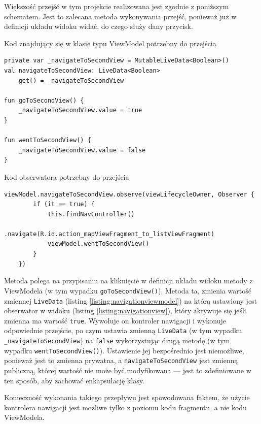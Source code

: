 \documentclass[polish,polish,a4paper,12pt]{article}
\begin{document}
	Większość przejść w tym projekcie realizowana jest zgodnie z poniższym schematem. Jest to zalecana metoda wykonywania przejść, ponieważ już w definicji układu widoku widać, do czego służy dany przycisk.

	\begin{listing}[H]
		\caption{Kod znajdujący się w klasie typu ViewModel potrzebny do przejścia}
		\begin{verbatim}
private var _navigateToSecondView = MutableLiveData<Boolean>()
val navigateToSecondView: LiveData<Boolean>
	get() = _navigateToSecondView

fun goToSecondView() {
	_navigateToSecondView.value = true
}

fun wentToSecondView() {
	_navigateToSecondView.value = false
}
		\end{verbatim}
		\label{listing:navigationviewmodel}
	\end{listing}

	\begin{listing}[H]
		\caption{Kod obserwatora potrzebny do przejścia}
		\begin{verbatim}
viewModel.navigateToSecondView.observe(viewLifecycleOwner, Observer {
		if (it == true) {
			this.findNavController()
				.navigate(R.id.action_mapViewFragment_to_listViewFragment)
			viewModel.wentToSecondView()
		}
	})
		\end{verbatim}
		\label{listing:navigationview}
	\end{listing}

	Metoda polega na przypisaniu na kliknięcie w definicji układu widoku metody z ViewModela (w tym wypadku \texttt{goToSecondView()}). Metoda ta, zmienia wartość zmiennej \texttt{LiveData} (listing \ref{listing:navigationviewmodel}) na którą ustawiony jest obserwator w widoku (listing \ref{listing:navigationview}), który aktywuje się jeśli zmienna ma wartość \texttt{true}. Wywołuje on kontroler nawigacji i wykonuje odpowiednie przejście, po czym ustawia zmienną \texttt{LiveData} (w tym wypadku \texttt{\_navigateToSecondView}) na \texttt{false} wykorzystując drugą metodę (w tym wypadku \texttt{wentToSecondView()}). Ustawienie jej bezpośrednio jest niemożliwe, ponieważ jest to zmienna prywatna, a \texttt{navigateToSecondView} jest zmienną publiczną, której wartość nie może być modyfikowana — jest to zdefiniowane w ten sposób, aby zachować enkapsulację klasy.

	Konieczność wykonania takiego przepływu jest spowodowana faktem, że użycie kontrolera nawigacji jest możliwe tylko z poziomu kodu fragmentu, a nie kodu ViewModela.
\end{document}
